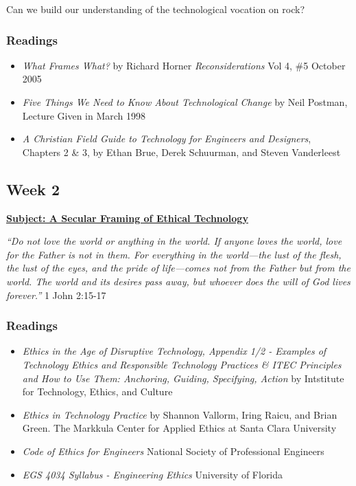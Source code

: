 \documentclass[11pt]{article}
\begin{document}
Can we build our understanding of the technological vocation on rock?
\subsubsection*{Readings}
\label{sec:org356c16a}
\begin{itemize}
\item \emph{What Frames What?} by Richard Horner \emph{Reconsiderations} Vol 4, \#5 October
2005
\item \emph{Five Things We Need to Know About Technological Change} by Neil Postman,
Lecture Given in March 1998
\item \emph{A Christian Field Guide to Technology for Engineers and Designers}, Chapters
2 \& 3, by Ethan Brue, Derek Schuurman, and Steven Vanderleest
\end{itemize}
\subsection*{Week 2}
\label{sec:org8d1623f}
\textbf{\uline{Subject: A Secular Framing of Ethical Technology}}
\begin{mdframed}[nobreak=true]
\emph{``Do not love the world or anything in the world. If anyone loves the world,
love for the Father is not in them. For everything in the world—the lust
of the flesh, the lust of the eyes, and the pride of life—comes not from the
Father but from the world. The world and its desires pass away, but whoever
does the will of God lives forever.''} 1 John 2:15-17
\end{mdframed}
\subsubsection*{Readings}
\label{sec:orgdacf07b}
\begin{itemize}
\item \emph{Ethics in the Age of Disruptive Technology, Appendix 1/2 - Examples of
Technology Ethics and Responsible Technology Practices \& ITEC Principles and
How to Use Them: Anchoring, Guiding, Specifying, Action} by Intstitute for
Technology, Ethics, and Culture
\item \emph{Ethics in Technology Practice} by Shannon Vallorm, Iring Raicu, and Brian
Green. The Markkula Center for Applied Ethics at Santa Clara University
\item \emph{Code of Ethics for Engineers} National Society of Professional Engineers
\item \emph{EGS 4034 Syllabus - Engineering Ethics} University of Florida
\end{itemize}
\end{document}
